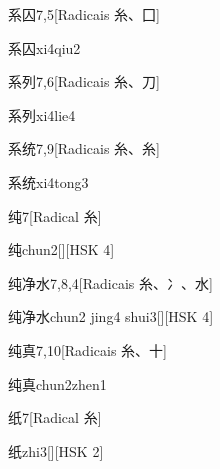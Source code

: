 \begin{entry}{系囚}{7,5}[Radicais ⽷、⼞]
  \begin{phonetics}{系囚}{xi4qiu2}
  \end{phonetics}
\end{entry}

\begin{entry}{系列}{7,6}[Radicais ⽷、⼑]
  \begin{phonetics}{系列}{xi4lie4}
  \end{phonetics}
\end{entry}

\begin{entry}{系统}{7,9}[Radicais ⽷、⽷]
  \begin{phonetics}{系统}{xi4tong3}
  \end{phonetics}
\end{entry}

\begin{entry}{纯}{7}[Radical ⽷]
  \begin{phonetics}{纯}{chun2}[][HSK 4]
  \end{phonetics}
\end{entry}

\begin{entry}{纯净水}{7,8,4}[Radicais ⽷、⼎、⽔]
  \begin{phonetics}{纯净水}{chun2 jing4 shui3}[][HSK 4]
  \end{phonetics}
\end{entry}

\begin{entry}{纯真}{7,10}[Radicais ⽷、⼗]
  \begin{phonetics}{纯真}{chun2zhen1}
  \end{phonetics}
\end{entry}

\begin{entry}{纸}{7}[Radical ⽷]
  \begin{phonetics}{纸}{zhi3}[][HSK 2]
  \end{phonetics}
\end{entry}

